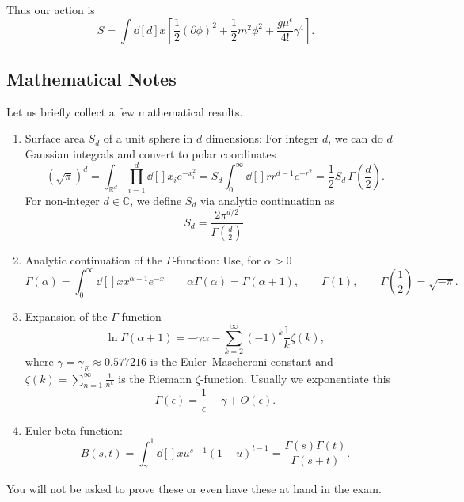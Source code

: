
Thus our action is 
\begin{equation}
  S = \int \dd[d]{x} \left[ \frac{1}{2} (\partial \phi)^2 + \frac{1}{2} m^2 \phi^2 + \frac{g \mu^\epsilon}{4!} \gamma^4 \right].
\end{equation}

\subsection{Mathematical Notes}%
\label{sub:mathematical_notes}

Let us briefly collect a few mathematical results.
\begin{enumerate}[1.]
  \item Surface area $S_d$ of a unit sphere in $d$ dimensions:
    For integer $d$, we can do $d$ Gaussian integrals and convert to polar coordinates
    \begin{equation}
      (\sqrt{\pi})^d = \int_{\mathbb{R}^d} \prod_{i=1}^d \dd[]{x_i} e^{-x_i^2} = S_d \int_0^{\infty} \dd[]{r} r^{d-1} e^{-r^2} = \frac{1}{2} S_d \, \Gamma(\frac{d}{2}).
    \end{equation}
    For non-integer $d \in \mathbb{C}$, we define $S_d$ via analytic continuation as
    \begin{equation}
      S_d = \frac{2 \pi^{d / 2}}{\Gamma(\frac{d}{2})}.
    \end{equation}
  \item Analytic continuation of the $\Gamma$-function:
    Use, for $\alpha > 0$
    \begin{equation}
      \Gamma(\alpha) = \int_0^\infty \dd[]{x} x^{\alpha -1} e^{-x} \qquad \alpha \Gamma(\alpha) = \Gamma(\alpha + 1), \qquad \Gamma(1), \qquad \Gamma(\frac{1}{2}) = \sqrt{-\pi}.
    \end{equation}
  \item Expansion of the $\Gamma$-function
    \begin{equation}
      \ln \Gamma(\alpha + 1) = -\gamma \alpha - \sum_{k=2}^{\infty} (-1)^k \frac{1}{k} \zeta(k),
    \end{equation}
    where $\gamma = \gamma_E \approx 0.577216$  is the Euler--Mascheroni constant and $\zeta(k) = \sum_{n=1}^{\infty} \frac{1}{n^k}$ is the Riemann $\zeta$-function.
    Usually we exponentiate this
    \begin{equation}
      \Gamma(\epsilon) = \frac{1}{\epsilon} - \gamma + O(\epsilon).
    \end{equation}
  \item Euler beta function:
    \begin{equation}
      B(s, t) = \int_{\gamma}^{1}\dd[]{x} u^{s-1} (1-u)^{t-1} = \frac{\Gamma(s) \Gamma(t)}{\Gamma(s + t)}.
    \end{equation}
\end{enumerate}
\begin{remark}
  You will not be asked to prove these or even have these at hand in the exam.
\end{remark}


